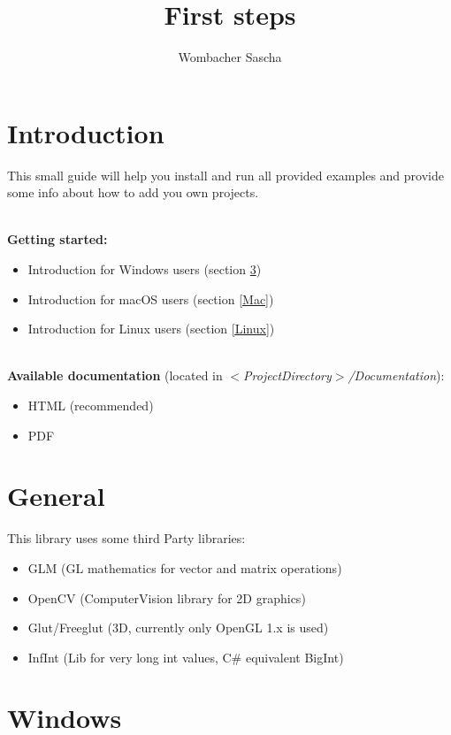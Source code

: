 \documentclass[]{article}
\title{First steps}
\author{Wombacher Sascha}
\begin{document}
\maketitle


\section{Introduction}

This small guide will help you install and run all provided examples and provide some info about how to add you own projects.

\mbox{} \\
\textbf{Getting started:}
\begin{itemize}
	\item Introduction for Windows users (section \ref{Windows})
	\item Introduction for \space macOS \space \space users (section \ref{Mac})
	\item Introduction for \space \space Linux \space \space \space users (section \ref{Linux})
\end{itemize}

\mbox{} \\
\textbf{Available documentation} (located in \textit{$<$ProjectDirectory$>$/Documentation}):
\begin{itemize}
\item HTML (recommended)
\item PDF
\end{itemize}

\section{General}
This library uses some third Party libraries:
\begin{itemize}
	\item GLM (GL mathematics for vector and matrix operations)
	\item OpenCV (ComputerVision library for 2D graphics)
	\item Glut/Freeglut (3D, currently only OpenGL 1.x is used)
	\item InfInt (Lib for very long int values, C\# equivalent BigInt)
\end{itemize}

\newpage
\section{Windows}\label{Windows}
\end{document}
